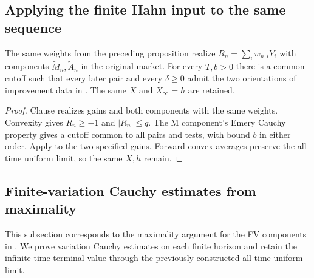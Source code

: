 \subsection{Applying the finite Hahn input to the same sequence}
\begin{proposition}\label{prop:sequence-hahn}
The same weights from the preceding proposition realize $R_n=\sum_iw_{n,i}Y_i$ with components
$\widetilde M_n,\widetilde A_n$ in the original market.
For every $T,b>0$ there is a common cutoff such that every later pair and every $\delta\geq0$
admit the two orientations of improvement data in .
The same $X$ and $X_\infty=h$ are retained.
\end{proposition}
\begin{proof}
Clause  realizes gains and both components with the same weights.
Convexity gives $R_n\geq-1$ and $|R_n|\leq q$.
The M component's Emery Cauchy property gives a cutoff common to all pairs and tests, with bound $b$ in either order.
Apply  to the two specified gains.
Forward convex averages preserve the all-time uniform limit, so the same $X,h$ remain.
\end{proof}

\subsection{Finite-variation Cauchy estimates from maximality}\label{sec:fv-cauchy}
This subsection corresponds to the maximality argument for the FV components in \cite[Lemma 4.11]{DS}. We prove variation Cauchy estimates on each finite horizon and retain the infinite-time terminal value through the previously constructed all-time uniform limit.

